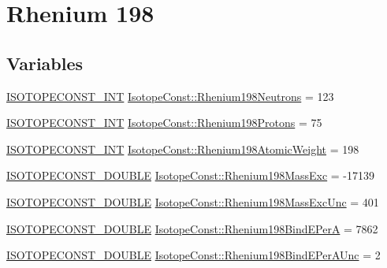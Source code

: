 \hypertarget{group___isotope_const-_rhenium-_re198}{}\section{Rhenium 198}
\label{group___isotope_const-_rhenium-_re198}
\subsection*{Variables}
\begin{DoxyCompactItemize}
\item 
\mbox{\hyperlink{group___isotope_const-_macros_ga5f18360b3e99483a35c32d789e62621c}{I\+S\+O\+T\+O\+P\+E\+C\+O\+N\+S\+T\+\_\+\+I\+NT}} \mbox{\hyperlink{group___isotope_const-_rhenium-_re198_ga40eef5a9da39bd1c91dd3cf3871aac9e}{Isotope\+Const\+::\+Rhenium198\+Neutrons}} = 123
\item 
\mbox{\hyperlink{group___isotope_const-_macros_ga5f18360b3e99483a35c32d789e62621c}{I\+S\+O\+T\+O\+P\+E\+C\+O\+N\+S\+T\+\_\+\+I\+NT}} \mbox{\hyperlink{group___isotope_const-_rhenium-_re198_ga04ecc6322e5998b3bd7c34d06aae3fe3}{Isotope\+Const\+::\+Rhenium198\+Protons}} = 75
\item 
\mbox{\hyperlink{group___isotope_const-_macros_ga5f18360b3e99483a35c32d789e62621c}{I\+S\+O\+T\+O\+P\+E\+C\+O\+N\+S\+T\+\_\+\+I\+NT}} \mbox{\hyperlink{group___isotope_const-_rhenium-_re198_ga85f3f482ecb8e513a97e5c6f3a2c8c0f}{Isotope\+Const\+::\+Rhenium198\+Atomic\+Weight}} = 198
\item 
\mbox{\hyperlink{group___isotope_const-_macros_ga8f45a7272ce02c0b4c65c44636ed719a}{I\+S\+O\+T\+O\+P\+E\+C\+O\+N\+S\+T\+\_\+\+D\+O\+U\+B\+LE}} \mbox{\hyperlink{group___isotope_const-_rhenium-_re198_ga5322c57094ff17c07c8cf65b6db27091}{Isotope\+Const\+::\+Rhenium198\+Mass\+Exc}} = -\/17139
\item 
\mbox{\hyperlink{group___isotope_const-_macros_ga8f45a7272ce02c0b4c65c44636ed719a}{I\+S\+O\+T\+O\+P\+E\+C\+O\+N\+S\+T\+\_\+\+D\+O\+U\+B\+LE}} \mbox{\hyperlink{group___isotope_const-_rhenium-_re198_ga481a6977f514f7bee75e28ab4ac40d67}{Isotope\+Const\+::\+Rhenium198\+Mass\+Exc\+Unc}} = 401
\item 
\mbox{\hyperlink{group___isotope_const-_macros_ga8f45a7272ce02c0b4c65c44636ed719a}{I\+S\+O\+T\+O\+P\+E\+C\+O\+N\+S\+T\+\_\+\+D\+O\+U\+B\+LE}} \mbox{\hyperlink{group___isotope_const-_rhenium-_re198_ga2e1805d0931c4deae624243683ccfd0e}{Isotope\+Const\+::\+Rhenium198\+Bind\+E\+PerA}} = 7862
\item 
\mbox{\hyperlink{group___isotope_const-_macros_ga8f45a7272ce02c0b4c65c44636ed719a}{I\+S\+O\+T\+O\+P\+E\+C\+O\+N\+S\+T\+\_\+\+D\+O\+U\+B\+LE}} \mbox{\hyperlink{group___isotope_const-_rhenium-_re198_ga7eddc30503d72048efaf8301104644d3}{Isotope\+Const\+::\+Rhenium198\+Bind\+E\+Per\+A\+Unc}} = 2

\end{DoxyCompactItemize}
